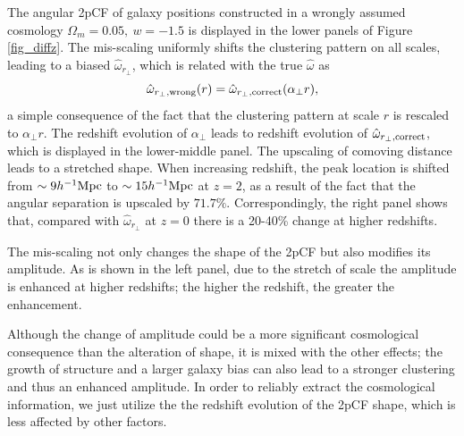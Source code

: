 \documentclass[iop]{emulateapj}
\begin{document}
The angular 2pCF of galaxy positions constructed in a wrongly assumed cosmology $\Omega_m=0.05,\ w=-1.5$
is displayed in the lower panels of Figure \ref{fig_diffz}.
The mis-scaling uniformly shifts the clustering pattern on all scales, 
leading to a biased $\hat \omega_{r_\perp}$, which is 
related with the true $\hat \omega$ as
\begin{equation}
 \hat \omega_{r_\perp,\rm wrong}(r) = \hat \omega_{r_\perp, \rm correct}(\alpha_{\perp} r),
\end{equation}
a simple consequence of the fact that the clustering pattern at scale $r$ is rescaled to $\alpha_{\perp} r$.
The redshift evolution of $\alpha_{\perp}$ leads to redshift evolution of 
$\hat \omega_{r_\perp, \rm correct}$,
which is displayed in the lower-middle panel.
The upscaling of comoving distance leads to a stretched shape.
When increasing redshift,
the peak location is shifted from $\sim9h^{-1} \rm Mpc$ to $\sim15 h^{-1}\rm Mpc$ at $z=2$,
as a result of the fact that the angular separation is upscaled by $71.7\%$.
Correspondingly, the right panel shows that, 
compared with $\hat \omega_{r_\perp}$ at $z=0$ there is a 20-40\% change at higher redshifts.

The mis-scaling not only changes the shape of the 2pCF but also modifies its amplitude. %
As is shown in the left panel, due to the stretch of scale the amplitude is enhanced at higher redshifts;
the higher the redshift, the greater the enhancement.%

Although the change of amplitude could be a more significant cosmological consequence 
than the alteration of shape,
it is mixed with the other effects; 
the growth of structure and a larger galaxy bias can also lead to a stronger clustering and thus an enhanced amplitude.
In order to reliably extract the cosmological information, 
we just utilize the the redshift evolution of the 2pCF shape, 
which is less affected by other factors.
\end{document}
